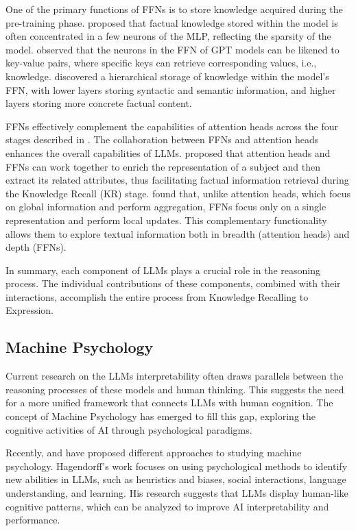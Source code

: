 \documentclass[12pt,letterpaper]{article}
\begin{document}
One of the primary functions of FFNs is to store knowledge acquired during the pre-training phase. 
\citet{MLPKnowledge} proposed that factual knowledge stored within the model is often concentrated in a few neurons of the MLP, reflecting the sparsity of the model.\citep{DeadNeuron_24_ACL_Meta}
\citet{TransformerKVpair} observed that the neurons in the FFN of GPT models can be likened to key-value pairs, where specific keys can retrieve corresponding values, i.e., knowledge.
\citet{FactualRecall_24_arXiv_RUC} discovered a hierarchical storage of knowledge within the model's FFN, with lower layers storing syntactic and semantic information, and higher layers storing more concrete factual content.

FFNs effectively complement the capabilities of attention heads across the four stages described in . The collaboration between FFNs and attention heads enhances the overall capabilities of LLMs.
\citet{FacutalRecall_23_EMNLP_Google} proposed that attention heads and FFNs can work together to enrich the representation of a subject and then extract its related attributes, thus facilitating factual information retrieval during the Knowledge Recall (KR) stage.
\citet{MLPLocalUpdate_23_EMNLP_ETH} found that, unlike attention heads, which focus on global information and perform aggregation, FFNs focus only on a single representation and perform local updates. This complementary functionality allows them to explore textual information both in breadth (attention heads) and depth (FFNs).

In summary, each component of LLMs plays a crucial role in the reasoning process. The individual contributions of these components, combined with their interactions, accomplish the entire process from Knowledge Recalling to Expression.


\subsection*{Machine Psychology} \label{subsec:MachinePsychology}
Current research on the LLMs interpretability often draws parallels between the reasoning processes of these models and human thinking. This suggests the need for a more unified framework that connects LLMs with human cognition. The concept of Machine Psychology has emerged to fill this gap,\citep{MachinePsychologyOrigin} exploring the cognitive activities of AI through psychological paradigms.

Recently, \citet{MachinePsychology_Hagendorff} and \citet{MachinePsychology_Johansson} have proposed different approaches to studying machine psychology.
Hagendorff's work focuses on using psychological methods to identify new abilities in LLMs, such as heuristics and biases, social interactions, language understanding, and learning. His research suggests that LLMs display human-like cognitive patterns, which can be analyzed to improve AI interpretability and performance.
\end{document}
